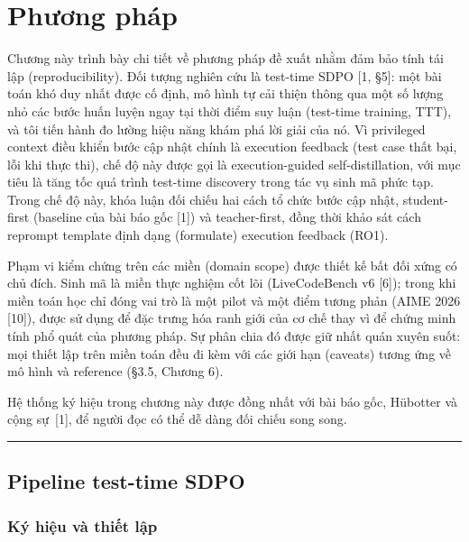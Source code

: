 \chapter{Phương pháp}\label{chapter-3-method}

Chương này trình bày chi tiết về phương pháp đề xuất nhằm đảm bảo tính tái lập (reproducibility). Đối tượng nghiên cứu là test-time SDPO {[}1, §5{]}: một bài toán khó duy nhất được cố định, mô hình tự cải thiện thông qua một số lượng nhỏ các bước huấn luyện ngay tại thời điểm suy luận (test-time training, TTT), và tôi tiến hành đo lường hiệu năng khám phá lời giải của nó. Vì privileged context điều khiển bước cập nhật chính là execution feedback (test case thất bại, lỗi khi thực thi), chế độ này được gọi là execution-guided self-distillation, với mục tiêu là tăng tốc quá trình test-time discovery trong tác vụ sinh mã phức tạp. Trong chế độ này, khóa luận đối chiếu hai cách tổ chức bước cập nhật, student-first (baseline của bài báo gốc {[}1{]}) và teacher-first, đồng thời khảo sát cách reprompt template định dạng (formulate) execution feedback (RO1).

Phạm vi kiểm chứng trên các miền (domain scope) được thiết kế bất đối xứng có chủ đích. Sinh mã là miền thực nghiệm cốt lõi (LiveCodeBench v6 {[}6{]}); trong khi miền toán học chỉ đóng vai trò là một pilot và một điểm tương phản (AIME 2026 {[}10{]}), được sử dụng để đặc trưng hóa ranh giới của cơ chế thay vì để chứng minh tính phổ quát của phương pháp. Sự phân chia đó được giữ nhất quán xuyên suốt: mọi thiết lập trên miền toán đều đi kèm với các giới hạn (caveats) tương ứng về mô hình và reference (§3.5, Chương 6).

Hệ thống ký hiệu trong chương này được đồng nhất với bài báo gốc, Hübotter và cộng sự~{[}1{]}, để người đọc có thể dễ dàng đối chiếu song song.

\begin{center}\rule{0.5\linewidth}{0.5pt}\end{center}

\section{Pipeline test-time SDPO}\label{test-time-sdpo-pipeline}

\subsection{Ký hiệu và thiết lập}\label{notation-and-setting}

